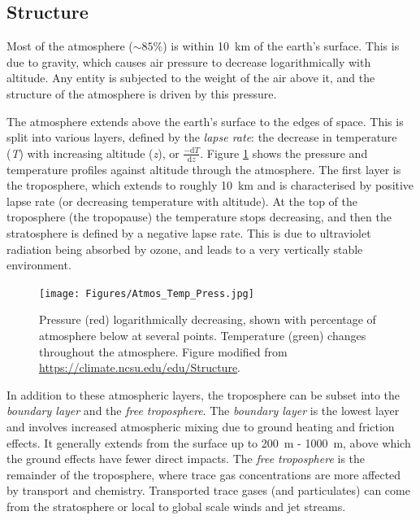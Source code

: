  
  \subsection{Structure}
  \label{LR:Atmos:Struct}
    
    Most of the atmosphere ($\sim 85\%$) is within 10~km of the earth's surface.
    This is due to gravity, which causes air pressure to decrease logarithmically with altitude.
    Any entity is subjected to the weight of the air above it, and the 
    structure of the atmosphere is driven by this pressure.
    
    The atmosphere extends above the earth's surface to the edges of space. 
    This is split into various layers, defined by the \textit{lapse rate}: the decrease in temperature (\textit{T}) with increasing altitude (\textit{z}), or $\frac{-\textrm{d}T}{\textrm{d}z}$.
    Figure \ref{LR:Atmos:Struct:Fig_atmos_layers} shows the pressure and temperature profiles against altitude through the atmosphere.
    The first layer is the troposphere, which extends to roughly 10~km and is characterised by positive lapse rate (or decreasing temperature with altitude).
    At the top of the troposphere (the tropopause) the temperature stops decreasing, and then the stratosphere is defined by a negative lapse rate.
    This is due to ultraviolet radiation being absorbed by ozone, and leads to a very vertically stable environment.
    
    \begin{figure}
      \texttt{[image: Figures/Atmos\_Temp\_Press.jpg]}
      \caption{%
        Pressure (red) logarithmically decreasing, shown with percentage of atmosphere below at several points.
        Temperature (green) changes throughout the atmosphere.
        Figure modified from \url{https://climate.ncsu.edu/edu/Structure}.
      }
      \label{LR:Atmos:Struct:Fig_atmos_layers}
    \end{figure}
    
    
    
    In addition to these atmospheric layers, the troposphere can be subset into the \textit{boundary layer} and the \textit{free troposphere}.
    The \textit{boundary layer} is the lowest layer and involves increased atmospheric mixing due to ground heating and friction effects.
    It generally extends from the surface up to 200~m - 1000~m, above which the ground effects have fewer direct impacts.
    The \textit{free troposphere} is the remainder of the troposphere, where 
    trace gas concentrations are more affected by transport and chemistry.
    Transported trace gases (and particulates) can come from the stratosphere 
    or local to global scale winds and jet streams.
    
